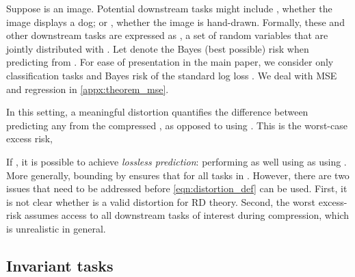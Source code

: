 \documentclass[final]{article}
\begin{document}
Suppose  is an image. Potential downstream tasks might include , whether the image displays a dog; or , whether the image is hand-drawn. Formally, these and other downstream tasks are expressed as , a set of random variables that are jointly distributed with . 
Let  denote the Bayes (best possible) risk when predicting  from .
For ease of presentation in the main paper, we consider only classification tasks  and Bayes risk of the standard log loss .
We deal with MSE and regression in \cref{appx:theorem_mse}.

In this setting, a meaningful distortion  quantifies the difference between predicting any  from the compressed , as opposed to using . This is the worst-case excess risk,

If , it is possible to achieve \textit{lossless prediction}: performing as well using  as using .
More generally, bounding \disttext{} by  ensures that  for all tasks in . 
However, there are two issues that need to be addressed before \cref{eqn:distortion_def} can be used. 
First, it is not clear whether \disttext{} is a valid distortion for RD theory.
Second, the worst excess-risk \disttext{} assumes access to all downstream tasks of interest  during compression, which is unrealistic in general. 


\subsection{Invariant tasks}
\end{document}
